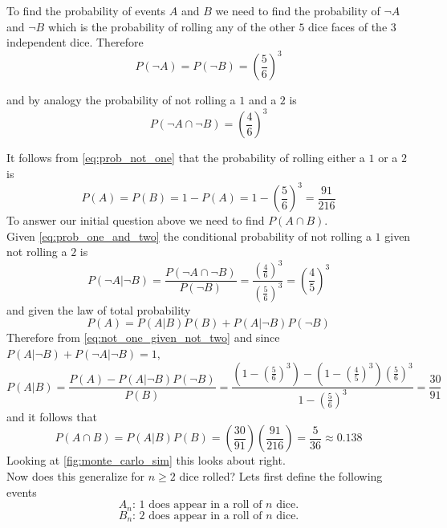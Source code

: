 \documentclass[12pt,a4paper]{article}
\begin{document}
To find the probability of events $A$ and $B$ we need to find the probability of $\neg A$ and $\neg B$ which is the probability of rolling any of the other $5$ dice faces of the $3$ independent dice. Therefore
\begin{equation}
P(\neg A) = P(\neg B) = \left(\frac{5}{6}\right)^3
\label{eq:prob_not_one}
\end{equation}

and by analogy the probability of not rolling a $1$ and a $2$ is
\begin{equation}
P(\neg A \cap \neg B) = \left(\frac{4}{6}\right)^3
\label{eq:prob_one_and_two}
\end{equation}

It follows from \cref{eq:prob_not_one} that the probability of rolling either a $1$ or a $2$ is
\begin{equation}
P(A) = P(B) = 1-P(A) = 1 - \left(\frac{5}{6}\right)^3 = \frac{91}{216}
\end{equation}
To answer our initial question above we need to find $P(A \cap B)$.\\

Given \cref{eq:prob_one_and_two} the conditional probability of not rolling a $1$ given not rolling a $2$ is
\begin{equation}
P(\neg A| \neg B) = \frac{P(\neg A \cap \neg B)}{P(\neg B)} = \frac{\left(\frac{4}{6}\right)^3}{\left(\frac{5}{6}\right)^3} = \left(\frac{4}{5}\right)^3
\label{eq:not_one_given_not_two}
\end{equation}
and given the law of total probability
\begin{equation}
P(A) = P(A|B)P(B)+P(A|\neg B)P(\neg B)
\end{equation}
Therefore from \cref{eq:not_one_given_not_two} and since $P(A|\neg B) + P(\neg A|\neg B) = 1$,
\begin{equation}
P(A|B) = \frac{P(A) - P(A|\neg B)P(\neg B)}{P(B)} = \frac{\left(1-\left(\frac{5}{6}\right)^3\right) - \left(1-\left(\frac{4}{5}\right)^3\right)\left(\frac{5}{6}\right)^3}{1-\left(\frac{5}{6}\right)^3} = \frac{30}{91}
\end{equation}
and it follows that
\begin{equation}
P(A \cap B) = P(A|B)P(B) = \left(\frac{30}{91}\right) \left(\frac{91}{216}\right) = \frac{5}{36} \approx 0.138
\end{equation}
Looking at \cref{fig:monte_carlo_sim} this looks about right.\\

Now does this generalize for $n\geq 2$ dice rolled? Lets first define the following events
\begin{equation}
A_n \text{: 1 does appear in a roll of $n$ dice.}
\end{equation}
\begin{equation}
B_n \text{: 2 does appear in a roll of $n$ dice.}
\end{equation}
\end{document}
